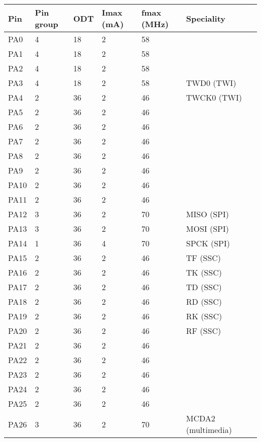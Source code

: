 \begin{table}
  \begin{tabular}{lllllll}
    Pin     & Pin group & ODT & Imax (mA) & fmax (MHz) & Speciality    \\ \hline    
    PA0     &  4 & 18 &  2 & 58 &       \\
    PA1     &  4 & 18 &  2 & 58 &       \\
    PA2     &  4 & 18 &  2 & 58 &       \\
    PA3     &  4 & 18 &  2 & 58 & TWD0  (TWI)      \\
    PA4     &  2 & 36 &  2 & 46 & TWCK0 (TWI)      \\
    PA5     &  2 & 36 &  2 & 46 &       \\
    PA6     &  2 & 36 &  2 & 46 &       \\
    PA7     &  2 & 36 &  2 & 46 &       \\
    PA8     &  2 & 36 &  2 & 46 &       \\
    PA9     &  2 & 36 &  2 & 46 &       \\
    PA10    &  2 & 36 &  2 & 46 &       \\
    PA11    &  2 & 36 &  2 & 46 &       \\
    PA12    &  3 & 36 &  2 & 70 & MISO (SPI)      \\
    PA13    &  3 & 36 &  2 & 70 & MOSI (SPI)      \\
    PA14    &  1 & 36 &  4 & 70 & SPCK (SPI)      \\
    PA15    &  2 & 36 &  2 & 46 & TF (SSC)      \\
    PA16    &  2 & 36 &  2 & 46 & TK (SSC)      \\
    PA17    &  2 & 36 &  2 & 46 & TD (SSC)      \\
    PA18    &  2 & 36 &  2 & 46 & RD (SSC)      \\
    PA19    &  2 & 36 &  2 & 46 & RK (SSC)      \\
    PA20    &  2 & 36 &  2 & 46 & RF (SSC)      \\
    PA21    &  2 & 36 &  2 & 46 &       \\
    PA22    &  2 & 36 &  2 & 46 &       \\
    PA23    &  2 & 36 &  2 & 46 &       \\
    PA24    &  2 & 36 &  2 & 46 &       \\
    PA25    &  2 & 36 &  2 & 46 &       \\
    PA26    &  3 & 36 &  2 & 70 & MCDA2 (multimedia)      \\

\end{tabular}
\end{table}
